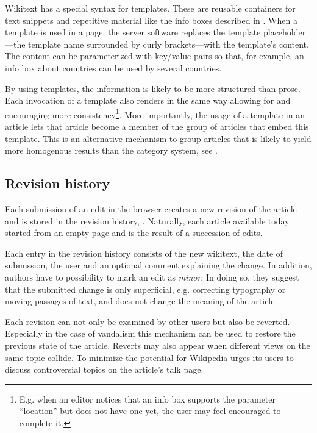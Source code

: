 Wikitext has a special syntax for templates. 
These are reusable containers for text snippets and repetitive material like the info boxes described in .
When a template is used in a page, the server software replaces the template placeholder---the template name surrounded by curly brackets---with the template's content.
The content can be parameterized with key/value pairs so that, for example, an info box about countries can be used by several countries.

By using templates, the information is likely to be more structured than prose.
Each invocation of a template also renders in the same way allowing for and encouraging more consistency\footnote{E.g. when an editor notices that an info box supports the parameter ``location'' but does not have one yet, the user may feel encouraged to complete it.}.
More importantly, the usage of a template in an article lets that article become a member of the group of articles that embed this template.
This is an alternative mechanism to group articles that is likely to yield more homogenous results than the category system, see .

\subsection{Revision history}\label{sub:revisionhistory}

Each submission of an edit in the browser creates a new revision of the article and is stored in the revision history, .
Naturally, each article available today started from an empty page and is the result of a succession of edits.


Each entry in the revision history consists of the new wikitext, the date of submission, the user and an optional comment explaining the change.
In addition, authors have to possibility to mark an edit as \emph{minor}.
In doing so, they suggest that the submitted change is only superficial, e.g. correcting typography or moving passages of text, and does not change the meaning of the article.\cite{wpminor}

Each revision can not only be examined by other users but also be reverted. 
Especially in the case of vandalism this mechanism can be used to restore the previous state of the article.
Reverts may also appear when different views on the same topic collide.
To minimize the potential for \cite{suh2007us} Wikipedia urges its users to discuss controversial topics on the article's talk page.


